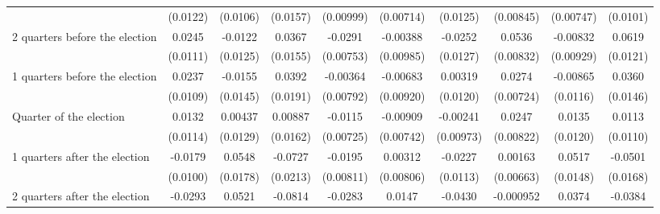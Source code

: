 \begin{table}[htbp]
\begin{tabular}{l*{9}{c}}
                    &    (0.0122)         &    (0.0106)         &    (0.0157)         &   (0.00999)         &   (0.00714)         &    (0.0125)         &   (0.00845)         &   (0.00747)         &    (0.0101)         \\
[1em]
 2 quarters before the election&      0.0245\sym{*}  &     -0.0122         &      0.0367\sym{*}  &     -0.0291\sym{***}&    -0.00388         &     -0.0252\sym{*}  &      0.0536\sym{***}&    -0.00832         &      0.0619\sym{***}\\
                    &    (0.0111)         &    (0.0125)         &    (0.0155)         &   (0.00753)         &   (0.00985)         &    (0.0127)         &   (0.00832)         &   (0.00929)         &    (0.0121)         \\
[1em]
 1 quarters before the election&      0.0237\sym{*}  &     -0.0155         &      0.0392\sym{*}  &    -0.00364         &    -0.00683         &     0.00319         &      0.0274\sym{***}&    -0.00865         &      0.0360\sym{*}  \\
                    &    (0.0109)         &    (0.0145)         &    (0.0191)         &   (0.00792)         &   (0.00920)         &    (0.0120)         &   (0.00724)         &    (0.0116)         &    (0.0146)         \\
[1em]
Quarter of the election&      0.0132         &     0.00437         &     0.00887         &     -0.0115         &    -0.00909         &    -0.00241         &      0.0247\sym{**} &      0.0135         &      0.0113         \\
                    &    (0.0114)         &    (0.0129)         &    (0.0162)         &   (0.00725)         &   (0.00742)         &   (0.00973)         &   (0.00822)         &    (0.0120)         &    (0.0110)         \\
[1em]
 1 quarters after the election&     -0.0179         &      0.0548\sym{**} &     -0.0727\sym{***}&     -0.0195\sym{*}  &     0.00312         &     -0.0227\sym{*}  &     0.00163         &      0.0517\sym{***}&     -0.0501\sym{**} \\
                    &    (0.0100)         &    (0.0178)         &    (0.0213)         &   (0.00811)         &   (0.00806)         &    (0.0113)         &   (0.00663)         &    (0.0148)         &    (0.0168)         \\
[1em]
 2 quarters after the election&     -0.0293\sym{**} &      0.0521\sym{**} &     -0.0814\sym{***}&     -0.0283\sym{***}&      0.0147\sym{*}  &     -0.0430\sym{***}&   -0.000952         &      0.0374\sym{*}  &     -0.0384\sym{*}  \\

\end{tabular}
\end{table}

